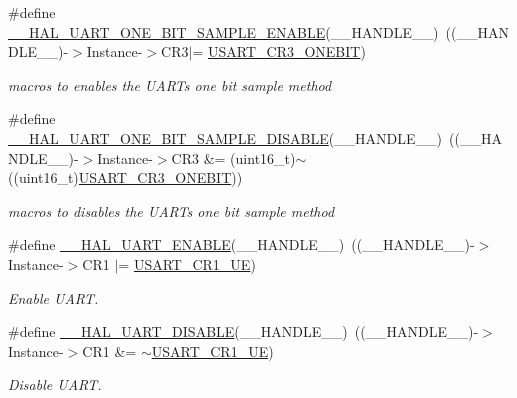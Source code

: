 \begin{DoxyCompactItemize}
\#define \hyperlink{group___u_a_r_t___exported___macros_ga3524747e5896296ab066d786431503ce}{\+\_\+\+\_\+\+H\+A\+L\+\_\+\+U\+A\+R\+T\+\_\+\+O\+N\+E\+\_\+\+B\+I\+T\+\_\+\+S\+A\+M\+P\+L\+E\+\_\+\+E\+N\+A\+B\+LE}(\+\_\+\+\_\+\+H\+A\+N\+D\+L\+E\+\_\+\+\_\+)~((\+\_\+\+\_\+\+H\+A\+N\+D\+L\+E\+\_\+\+\_\+)-\/$>$Instance-\/$>$C\+R3$\vert$= \hyperlink{group___peripheral___registers___bits___definition_ga9a96fb1a7beab602cbc8cb0393593826}{U\+S\+A\+R\+T\+\_\+\+C\+R3\+\_\+\+O\+N\+E\+B\+IT})
\begin{DoxyCompactList}\small\item\em macros to enables the U\+A\+RT\textquotesingle{}s one bit sample method \end{DoxyCompactList}\item 
\#define \hyperlink{group___u_a_r_t___exported___macros_ga2dbd7e6592e8c5999f817b69f0fd24bb}{\+\_\+\+\_\+\+H\+A\+L\+\_\+\+U\+A\+R\+T\+\_\+\+O\+N\+E\+\_\+\+B\+I\+T\+\_\+\+S\+A\+M\+P\+L\+E\+\_\+\+D\+I\+S\+A\+B\+LE}(\+\_\+\+\_\+\+H\+A\+N\+D\+L\+E\+\_\+\+\_\+)~((\+\_\+\+\_\+\+H\+A\+N\+D\+L\+E\+\_\+\+\_\+)-\/$>$Instance-\/$>$C\+R3 \&= (uint16\+\_\+t)$\sim$((uint16\+\_\+t)\hyperlink{group___peripheral___registers___bits___definition_ga9a96fb1a7beab602cbc8cb0393593826}{U\+S\+A\+R\+T\+\_\+\+C\+R3\+\_\+\+O\+N\+E\+B\+IT}))
\begin{DoxyCompactList}\small\item\em macros to disables the U\+A\+RT\textquotesingle{}s one bit sample method \end{DoxyCompactList}\item 
\#define \hyperlink{group___u_a_r_t___exported___macros_ga49eb5ea4996a957afeb8be2793ba3fe9}{\+\_\+\+\_\+\+H\+A\+L\+\_\+\+U\+A\+R\+T\+\_\+\+E\+N\+A\+B\+LE}(\+\_\+\+\_\+\+H\+A\+N\+D\+L\+E\+\_\+\+\_\+)~((\+\_\+\+\_\+\+H\+A\+N\+D\+L\+E\+\_\+\+\_\+)-\/$>$Instance-\/$>$C\+R1 $\vert$=  \hyperlink{group___peripheral___registers___bits___definition_ga2bb650676aaae4a5203f372d497d5947}{U\+S\+A\+R\+T\+\_\+\+C\+R1\+\_\+\+UE})
\begin{DoxyCompactList}\small\item\em Enable U\+A\+RT. \end{DoxyCompactList}\item 
\#define \hyperlink{group___u_a_r_t___exported___macros_gad2f9fbdb4adf3a09939e201eaeea072f}{\+\_\+\+\_\+\+H\+A\+L\+\_\+\+U\+A\+R\+T\+\_\+\+D\+I\+S\+A\+B\+LE}(\+\_\+\+\_\+\+H\+A\+N\+D\+L\+E\+\_\+\+\_\+)~((\+\_\+\+\_\+\+H\+A\+N\+D\+L\+E\+\_\+\+\_\+)-\/$>$Instance-\/$>$C\+R1 \&=  $\sim$\hyperlink{group___peripheral___registers___bits___definition_ga2bb650676aaae4a5203f372d497d5947}{U\+S\+A\+R\+T\+\_\+\+C\+R1\+\_\+\+UE})
\begin{DoxyCompactList}\small\item\em Disable U\+A\+RT. \end{DoxyCompactList}\end{DoxyCompactItemize}


